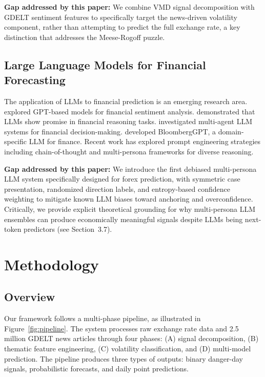 \documentclass[11pt]{article}
\begin{document}
\textbf{Gap addressed by this paper:} We combine VMD signal decomposition with GDELT sentiment features to specifically target the news-driven volatility component, rather than attempting to predict the full exchange rate, a key distinction that addresses the Meese-Rogoff puzzle.

\subsection{Large Language Models for Financial Forecasting}

The application of LLMs to financial prediction is an emerging research area. \citet{lopez2023} explored GPT-based models for financial sentiment analysis. \citet{xie2023} demonstrated that LLMs show promise in financial reasoning tasks. \citet{li2024llm} investigated multi-agent LLM systems for financial decision-making. \citet{wu2023bloomberggpt} developed BloombergGPT, a domain-specific LLM for finance. Recent work has explored prompt engineering strategies including chain-of-thought \citep{wei2022} and multi-persona frameworks for diverse reasoning.

\textbf{Gap addressed by this paper:} We introduce the first debiased multi-persona LLM system specifically designed for forex prediction, with symmetric case presentation, randomized direction labels, and entropy-based confidence weighting to mitigate known LLM biases toward anchoring and overconfidence. Critically, we provide explicit theoretical grounding for why multi-persona LLM ensembles can produce economically meaningful signals despite LLMs being next-token predictors (see Section~3.7).

\section{Methodology}
\label{sec:method}

\subsection{Overview}

Our framework follows a multi-phase pipeline, as illustrated in Figure~\ref{fig:pipeline}. The system processes raw exchange rate data and 2.5 million GDELT news articles through four phases: (A) signal decomposition, (B) thematic feature engineering, (C) volatility classification, and (D) multi-model prediction. The pipeline produces three types of outputs: binary danger-day signals, probabilistic forecasts, and daily point predictions.
\end{document}
